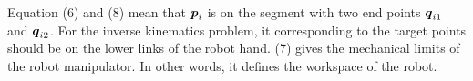 \documentclass[journal,comsoc]{IEEEtran}
\begin{document}
Equation (6) and (8) mean that $\mbox{\boldmath $p$}_i$ is on the segment with two end points $\mbox{\boldmath $q$}_{i1}$ and $\mbox{\boldmath $q$}_{i2}$. For the inverse kinematics problem, it corresponding to the target points should be on the lower links of the robot hand. (7) gives the mechanical limits of the robot manipulator. In other words, it defines the workspace of the robot. \\



 




%
%



%
%
\end{document}
